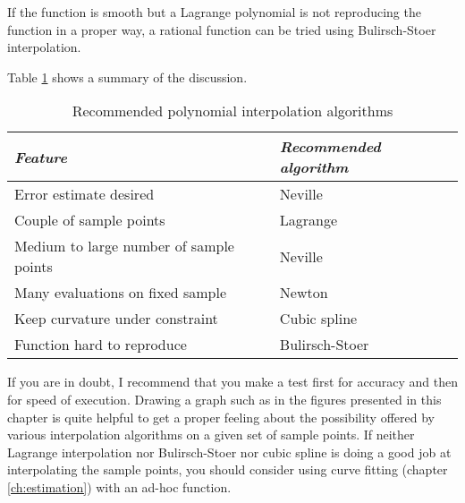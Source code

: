 \documentclass[twoside]{book}
\begin{document}
If the function is smooth but a Lagrange polynomial is not
reproducing the function in a proper way, a rational function can
be tried using Bulirsch-Stoer interpolation.

Table \ref{tb:interpol} shows a summary of the discussion.
\begin{table}[h]
  \centering
  \caption{Recommended polynomial interpolation algorithms}\label{tb:interpol}
  \vspace{1 ex}
\begin{tabular}{|l|l|} \hline
  {\sl Feature} & {\sl Recommended algorithm} \\ \hline
  Error estimate desired&Neville\\ \hline
  Couple of sample points&Lagrange \\ \hline
  Medium to large number of sample points&Neville \\ \hline
  Many evaluations on fixed sample&Newton\\ \hline
  Keep curvature under constraint&Cubic spline\\ \hline
  Function hard to reproduce&Bulirsch-Stoer\\ \hline
\end{tabular}
\end{table}
If you are in doubt, I recommend that you make a test first for
accuracy and then for speed of execution. Drawing a graph such as
in the figures presented in this chapter is quite helpful to get a
proper feeling about the possibility offered by various
interpolation algorithms on a given set of sample points. If
neither Lagrange interpolation nor Bulirsch-Stoer nor cubic spline
is doing a good job at interpolating the sample points, you should
consider using curve fitting (\cf chapter \ref{ch:estimation})
with an ad-hoc function.

\ifx\wholebook\relax\else
\end{document}
